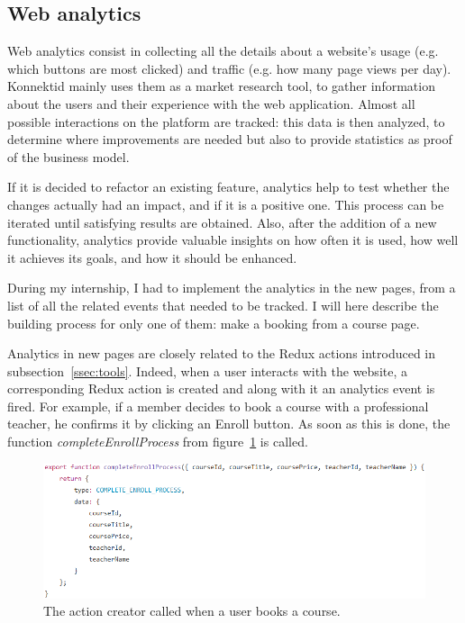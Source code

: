 \subsection{Web analytics}
\label{ssec:analytics}

Web analytics consist in collecting all the details about a website's usage (e.g. which buttons are most clicked) and traffic (e.g. how many page views per day). Konnektid mainly uses them as a market research tool, to gather information about the users and their experience with the web application. Almost all possible interactions on the platform are tracked: this data is then analyzed, to determine where improvements are needed but also to provide statistics as proof of the business model. 

If it is decided to refactor an existing feature, analytics help to test whether the changes actually had an impact, and if it is a positive one. This process can be iterated until satisfying results are obtained. Also, after the addition of a new functionality, analytics provide valuable insights on how often it is used, how well it achieves its goals, and how it should be enhanced.

During my internship, I had to implement the analytics in the new pages, from a list of all the related events that needed to be tracked. I will here describe the building process for only one of them: make a booking from a course page. 

Analytics in new pages are closely related to the Redux actions introduced in {\sc subsection}~\ref{ssec:tools}. Indeed, when a user interacts with the website, a corresponding Redux action is created and along with it an analytics event is fired. For example, if a member decides to book a course with a professional teacher, he confirms it by clicking an \guillemotleft{} Enroll \guillemotright{} button. As soon as this is done, the function \textit{completeEnrollProcess} from {\sc figure}~\ref{fig:enroll} is called.

\begin{figure}[H]
    \centering
    \includegraphics[scale=0.9]{figure/enroll.png}
    \caption{The action creator called when a user books a course.}
    \label{fig:enroll}
\end{figure}

